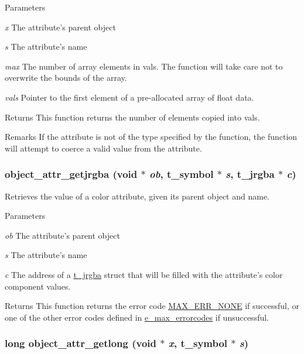 \begin{DoxyParams}{Parameters}
\item[{\em x}]The attribute's parent object \item[{\em s}]The attribute's name \item[{\em max}]The number of array elements in {\ttfamily vals}. The function will take care not to overwrite the bounds of the array. \item[{\em vals}]Pointer to the first element of a pre-\/allocated array of float data.\end{DoxyParams}
\begin{DoxyReturn}{Returns}
This function returns the number of elements copied into {\ttfamily vals}.
\end{DoxyReturn}
\begin{DoxyRemark}{Remarks}
If the attribute is not of the type specified by the function, the function will attempt to coerce a valid value from the attribute. 
\end{DoxyRemark}
\hypertarget{group__attr_ga03356b7e93ce954ba8d34821d2fb6217}{
\subsubsection[{object\_\-attr\_\-getjrgba}]{ object\_\-attr\_\-getjrgba (void $\ast$ {\em ob}, \/  {\bf t\_\-symbol} $\ast$ {\em s}, \/  {\bf t\_\-jrgba} $\ast$ {\em c})}}
\label{group__attr_ga03356b7e93ce954ba8d34821d2fb6217}


Retrieves the value of a color attribute, given its parent object and name. 
\begin{DoxyParams}{Parameters}
\item[{\em ob}]The attribute's parent object \item[{\em s}]The attribute's name \item[{\em c}]The address of a \hyperlink{structt__jrgba}{t\_\-jrgba} struct that will be filled with the attribute's color component values. \end{DoxyParams}
\begin{DoxyReturn}{Returns}
This function returns the error code \hyperlink{group__misc_gga0764dd6c02b76cca7d053ae50555d69da6d22f77fef8b1e1b074cef5d29d935fd}{MAX\_\-ERR\_\-NONE} if successful, or one of the other error codes defined in \hyperlink{group__misc_ga0764dd6c02b76cca7d053ae50555d69d}{e\_\-max\_\-errorcodes} if unsuccessful. 
\end{DoxyReturn}
\hypertarget{group__attr_ga1179c4e91fb8263447ff4dfa471df953}{
\subsubsection[{object\_\-attr\_\-getlong}]{\setlength{\rightskip}{0pt plus 5cm}long object\_\-attr\_\-getlong (void $\ast$ {\em x}, \/  {\bf t\_\-symbol} $\ast$ {\em s})}}
\label{group__attr_ga1179c4e91fb8263447ff4dfa471df953}


